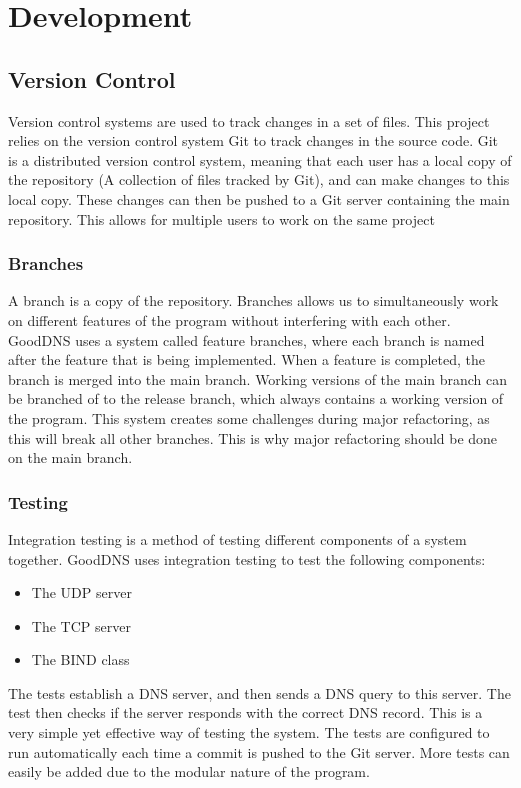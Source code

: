 \documentclass[12pt]{article}
\begin{document}
\section{Development}
\subsection{Version Control}
Version control systems are used to track changes in a set of files. This project relies
on the version control system Git\cite{Git} to track changes in the source code. Git is a distributed version control system,
meaning that each user has a local copy of the repository (A collection of files tracked by Git), and can make changes to this local copy.
These changes can then be pushed to a Git server containing the main repository. This allows for multiple users to work on the same project

\subsubsection{Branches}
A branch is a copy of the repository. Branches allows us to simultaneously work on different features of the program without interfering with each other.
GoodDNS uses a system called feature branches, where each branch is named after the feature that is being implemented.
When a feature is completed, the branch is merged into the main branch.
Working versions of the main branch can be branched of to the release branch, which always contains a working version of the program.
This system creates some challenges during major refactoring, as this will break all other branches. 
This is why major refactoring should be done on the main branch.

\subsubsection{Testing}
Integration testing is a method of testing different components of a system together. GoodDNS uses integration testing to 
test the following components:
\begin{itemize}
    \item The UDP server
    \item The TCP server
    \item The BIND\cite{ZoneFile2023} class
\end{itemize}

The tests establish a DNS server, and then sends a DNS query to this server. The test then checks if the server responds with the correct DNS record.
This is a very simple yet effective way of testing the system. The tests are configured to run automatically each time a commit is pushed to the Git server.
More tests can easily be added due to the modular nature of the program.
\end{document}
